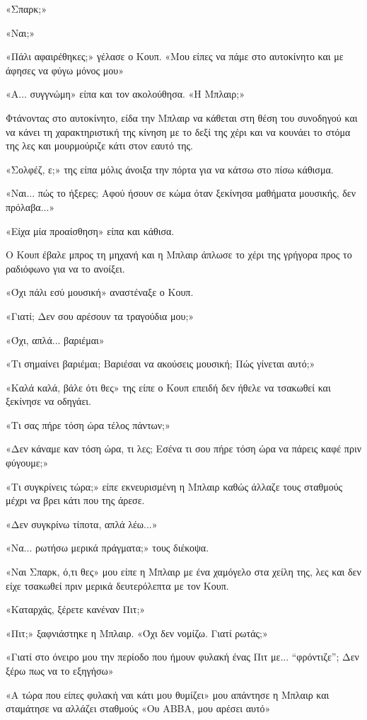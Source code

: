 \documentclass[12pt,twoside, openany]{book}
\begin{document}
«Σπαρκ;»

«Ναι;»

«Πάλι αφαιρέθηκες;» γέλασε ο Κουπ. «Μου είπες να πάμε στο αυτοκίνητο και με άφησες να φύγω μόνος μου»

«Α... συγγνώμη» είπα και τον ακολούθησα. «Η Μπλαιρ;»

Φτάνοντας στο αυτοκίνητο, είδα την Μπλαιρ να κάθεται στη θέση του συνοδηγού και να κάνει τη χαρακτηριστική της κίνηση με το δεξί της χέρι και να κουνάει το στόμα της λες και μουρμούριζε κάτι στον εαυτό της.

«Σολφέζ, ε;» της είπα μόλις άνοιξα την πόρτα για να κάτσω στο πίσω κάθισμα.

«Ναι... πώς το ήξερες; Αφού ήσουν σε κώμα όταν ξεκίνησα μαθήματα μουσικής, δεν πρόλαβα...»

«Είχα μία προαίσθηση» είπα και κάθισα.

Ο Κουπ έβαλε μπρος τη μηχανή και η Μπλαιρ άπλωσε το χέρι της γρήγορα προς το ραδιόφωνο για να το ανοίξει.

«Όχι πάλι εσύ μουσική» αναστέναξε ο Κουπ.

«Γιατί; Δεν σου αρέσουν τα τραγούδια μου;»

«Όχι, απλά... βαριέμαι»

«Τι σημαίνει βαριέμαι; Βαριέσαι να ακούσεις μουσική; Πώς γίνεται αυτό;»

«Καλά καλά, βάλε ότι θες» της είπε ο Κουπ επειδή δεν ήθελε να τσακωθεί και ξεκίνησε να οδηγάει.

«Τι σας πήρε τόση ώρα τέλος πάντων;»

«Δεν κάναμε καν τόση ώρα, τι λες; Εσένα τι σου πήρε τόση ώρα να πάρεις καφέ πριν φύγουμε;»

«Τι συγκρίνεις τώρα;» είπε εκνευρισμένη η Μπλαιρ καθώς άλλαζε τους σταθμούς μέχρι να βρει κάτι που της άρεσε.

«Δεν συγκρίνω τίποτα, απλά λέω...»

«Να... ρωτήσω μερικά πράγματα;» τους διέκοψα.

«Ναι Σπαρκ, ό,τι θες» μου είπε η Μπλαιρ με ένα χαμόγελο στα χείλη της, λες και δεν είχε τσακωθεί πριν μερικά δευτερόλεπτα με τον Κουπ.

«Καταρχάς, ξέρετε κανέναν Πιτ;»

«Πιτ;» ξαφνιάστηκε η Μπλαιρ. «Όχι δεν νομίζω. Γιατί ρωτάς;»

«Γιατί στο όνειρο μου την περίοδο που ήμουν φυλακή ένας Πιτ με... “φρόντιζε”; Δεν ξέρω πως να το εξηγήσω»

«Α τώρα που είπες φυλακή ναι κάτι μου θυμίζει» μου απάντησε η Μπλαιρ και σταμάτησε να αλλάζει σταθμούς «Ου ABBA, μου αρέσει αυτό»
\end{document}
